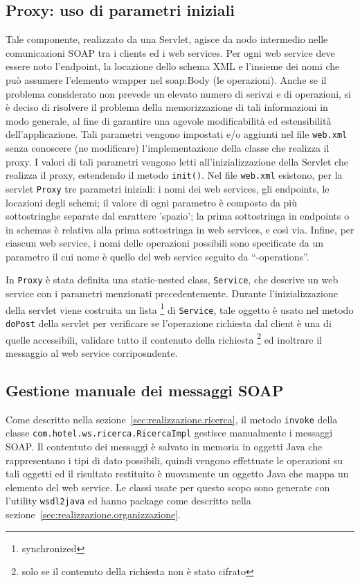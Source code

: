 \documentclass[a4paper]{article}
\begin{document}
\subsection{Proxy: uso di parametri iniziali}
Tale componente, realizzato da una Servlet, agisce da nodo intermedio
nelle comunicazioni SOAP tra i clients ed i web services. Per ogni web
service deve essere noto l'endpoint, la locazione dello schema XML e
l'insieme dei nomi che pu\`o assumere l'elemento wrapper nel soap:Body
(le operazioni). Anche se il problema considerato non prevede un
elevato numero di serivzi e di operazioni, si \`e deciso di risolvere
il problema della memorizzazione di tali informazioni in modo
generale, al fine di garantire una agevole modificabilit\`a ed
estensibilit\`a dell'applicazione.  Tali parametri vengono impostati
e/o aggiunti nel file \verb+web.xml+ senza conoscere (ne modificare)
l'implementazione della classe che realizza il proxy. I valori di tali
parametri vengono letti all'inizializzazione della Servlet che
realizza il proxy, estendendo il metodo \verb+init()+. Nel file
\verb+web.xml+ esistono, per la servlet \verb+Proxy+ tre parametri
iniziali: i nomi dei web services, gli endpoints, le locazioni degli
schemi; il valore di ogni parametro \`e composto da pi\`u
sottostringhe separate dal carattere 'spazio'; la prima sottostringa
in endpoints o in schemas \`e relativa alla prima sottostringa in web
services, e cos\`i via. Infine, per ciascun web service, i nomi delle
operazioni possibili sono specificate da un parametro il cui nome \`e
quello del web service seguito da ``-operations''.

In \verb+Proxy+ \`e stata definita una static-nested class,
\verb+Service+, che descrive un web service con i parametri menzionati
precedentemente. Durante l'inizializzazione della servlet viene
costruita un lista \footnote{synchronized} di \verb+Service+, tale oggetto
\`e usato nel metodo \verb+doPost+ della servlet per verificare se
l'operazione richiesta dal client \`e una di quelle accessibili,
validare tutto il contenuto della richiesta \footnote{solo se il
  contenuto della richiesta non \`e stato cifrato} ed inoltrare il
messaggio al web service corriposndente.


\subsection{Gestione manuale dei messaggi SOAP}

Come descritto nella sezione~\ref{sec:realizzazione.ricerca}, il
metodo \verb'invoke' della classe
\verb'com.hotel.ws.ricerca.Ricer'\-\verb'caImpl' gestisce manualmente i
messaggi SOAP. Il contentuto dei messaggi \`e salvato in memoria in
oggetti Java che rappresentano i tipi di dato possibili, quindi
vengono effettuate le operazioni su tali oggetti ed il risultato
restituito \`e nuovamente un oggetto Java che mappa un elemento del web
service. Le classi usate per questo scopo sono generate con l'utility
\verb'wsdl2java' ed hanno package come descritto nella
sezione~\ref{sec:realizzazione.organizzazione}.
\end{document}
